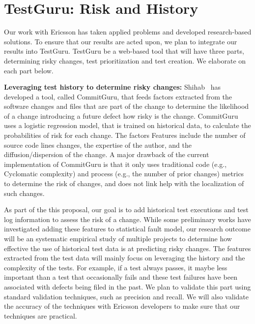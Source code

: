 \section{TestGuru: Risk and History}

Our work with Ericsson has taken applied problems and developed research-based solutions. To ensure that our results are acted upon, we plan to integrate our results into TestGuru. TestGuru be a web-based tool that will have three parts, determining risky changes, test prioritization and test creation. We elaborate on each part below.

\textbf{Leveraging test history to determine risky changes:} Shihab~\cite{Rosen2015FSE} has developed a tool, called CommitGuru, that feeds factors extracted from the software changes and files that are part of the change to determine the likelihood of a change introducing a future defect \ie how risky is the change. CommitGuru uses a logistic regression model, that is trained on historical data, to calculate the probabilities of risk for each change. The factors Features include the number of source code lines changes, the expertise of the author, and the diffusion/dispersion of the change. A major drawback of the current implementation of CommitGuru is that it only uses traditional code (e.g., Cyclomatic complexity) and process (e.g., the number of prior changes) metrics to determine the risk of changes, and does not link help with the localization of such changes.

As part of the this proposal, our goal is to add historical test executions and test log information to assess the risk of a change. While some preliminary works have investigated adding these features to statistical fault model\cite{herzig,others}, our research outcome will be an systematic empirical study of multiple projects to determine how effective the use of historical test data is at predicting risky changes. The features extracted from the test data will mainly focus on leveraging the history and the complexity of the tests. For example, if a test always passes, it maybe less important than a test that occasionally fails and these test failures have been associated with defects being filed in the past. We plan to validate this part using standard validation techniques, such as precision and recall. We will also validate the accuracy of the techniques with Ericsson developers to make sure that our techniques are practical.

